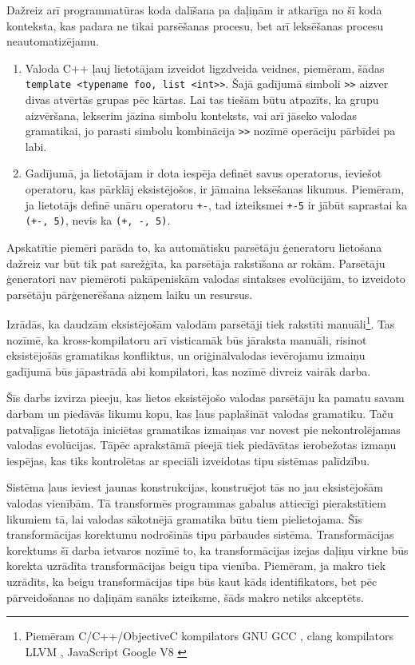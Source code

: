 Dažreiz arī programmatūras koda dalīšana pa daļiņām ir atkarīga no šī koda konteksta, kas padara ne tikai parsēšanas procesu, bet arī leksēšanas procesu neautomatizējamu.

\begin{enumerate}
\item
Valoda C++ ļauj lietotājam izveidot ligzdveida veidnes, piemēram, šādas \\ \verb|template <typename foo, list <int>>|. Šajā gadījumā simboli \verb|>>| aizver divas atvērtās grupas pēc kārtas. Lai tas tiešām būtu atpazīts, ka grupu aizvēršana, lekserim jāzina simbolu konteksts, vai arī jāseko valodas gramatikai, jo parasti simbolu kombinācija \verb|>>| nozīmē operāciju pārbīdei pa labi.
\item
Gadījumā, ja lietotājam ir dota iespēja definēt savus operatorus, ieviešot operatoru, kas pārklāj eksistējošos, ir jāmaina leksēšanas likumus. Piemēram, ja lietotājs definē unāru operatoru \verb|+-|, tad izteiksmei \verb|+-5| ir jābūt saprastai ka \verb|(+-, 5)|, nevis ka \verb|(+, -, 5)|.
\end{enumerate}

Apskatītie piemēri parāda to, ka automātisku parsētāju ģeneratoru lietošana dažreiz var būt tik pat sarežģīta, ka parsētāja rakstīšana ar rokām. Parsētāju ģeneratori nav piemēroti pakāpeniskām valodas sintakses evolūcijām, to izveidoto parsētāju pārģenerēšana aizņem laiku un resursus.

Izrādās, ka daudzām eksistējošām valodām parsētāji tiek rakstīti manuāli\footnote{Piemēram C/C++/ObjectiveC kompilators GNU GCC \cite{GCC}, clang kompilators LLVM \cite{clangLLVM}, JavaScript Google V8 \cite{JavascriptGoogle}}. Tas nozīmē, ka kross-kompilatoru arī visticamāk būs jāraksta manuāli, risinot eksistējošās gramatikas konfliktus, un oriģinālvalodas ievērojamu izmaiņu gadījumā būs jāpastrādā abi kompilatori, kas nozīmē divreiz vairāk darba. 

Šīs darbs izvirza pieeju, kas lietos eksistējošo valodas parsētāju ka pamatu savam darbam un piedāvās likumu kopu, kas ļaus paplašināt valodas gramatiku. Taču patvaļīgas lietotāja iniciētas gramatikas izmaiņas var novest pie nekontrolējamas valodas evolūcijas. Tāpēc aprakstāmā pieejā tiek piedāvātas ierobežotas izmaņu iespējas, kas tiks kontrolētas ar speciāli izveidotas tipu sistēmas palīdzību.

Sistēma ļaus ieviest jaunas konstrukcijas, konstruējot tās no jau eksistējošām valodas vienībām. Tā transformēs programmas gabalus attiecīgi pierakstītiem likumiem tā, lai valodas sākotnējā gramatika būtu tiem pielietojama. Šīs transformācijas korektumu nodrošinās tipu pārbaudes sistēma. Transformācijas korektums šī darba ietvaros nozīmē to, ka transformācijas izejas daļiņu virkne būs korekta uzrādīta transformācijas beigu tipa vienība. Piemēram, ja makro tiek uzrādīts, ka beigu transformācijas tips būs kaut kāds identifikators, bet pēc pārveidošanas no daļiņām sanāks izteiksme, šāds makro netiks akceptēts.

